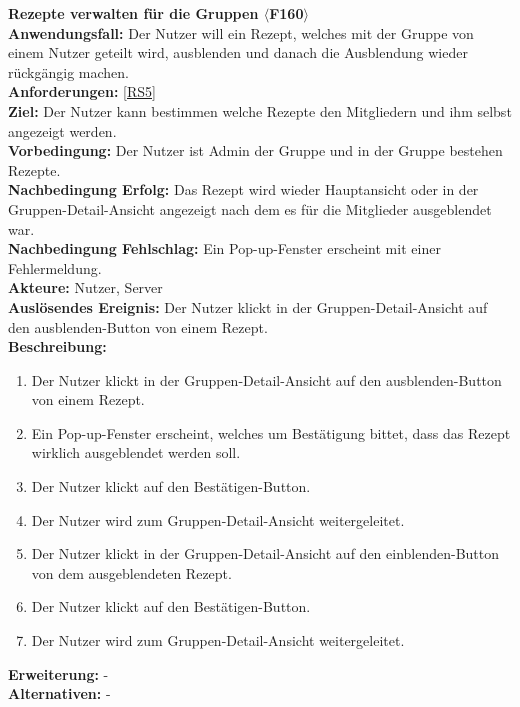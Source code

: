 \documentclass[parskip=full]{scrartcl}
\begin{document}
\textbf{Rezepte verwalten für die Gruppen $\langle$F160$\rangle$}\\
\textbf{Anwendungsfall:} Der Nutzer will ein Rezept, welches mit der Gruppe von einem Nutzer geteilt wird, ausblenden und danach die Ausblendung wieder rückgängig machen.\\
\textbf{Anforderungen:} \ref{RS5}\\
\textbf{Ziel:} Der Nutzer kann bestimmen welche Rezepte den Mitgliedern und ihm selbst angezeigt werden.\\
\textbf{Vorbedingung:} Der Nutzer ist Admin der Gruppe und in der Gruppe bestehen Rezepte.\\
\textbf{Nachbedingung Erfolg:} Das Rezept wird wieder Hauptansicht oder in der Gruppen-Detail-Ansicht angezeigt nach dem es für die Mitglieder  ausgeblendet war.\\
\textbf{Nachbedingung Fehlschlag:} Ein Pop-up-Fenster erscheint mit einer Fehlermeldung.\\
\textbf{Akteure:} Nutzer, Server \\
\textbf{Auslösendes Ereignis:} Der Nutzer klickt in der Gruppen-Detail-Ansicht auf den ausblenden-Button von einem Rezept.\\
\textbf{Beschreibung:}
\begin{enumerate}
    \item Der Nutzer klickt in der Gruppen-Detail-Ansicht auf den ausblenden-Button von einem Rezept.
    \item Ein Pop-up-Fenster erscheint, welches um Bestätigung bittet, dass das Rezept wirklich ausgeblendet werden soll.
    \item Der Nutzer klickt auf den Bestätigen-Button.
    \item Der Nutzer wird zum Gruppen-Detail-Ansicht weitergeleitet.
    \item Der Nutzer klickt in der Gruppen-Detail-Ansicht auf den einblenden-Button von dem ausgeblendeten Rezept.
    \item Der Nutzer klickt auf den Bestätigen-Button.
    \item Der Nutzer wird zum Gruppen-Detail-Ansicht weitergeleitet.
\end{enumerate}
\textbf{Erweiterung:} -\\
\textbf{Alternativen:} -
\newpage
\end{document}
